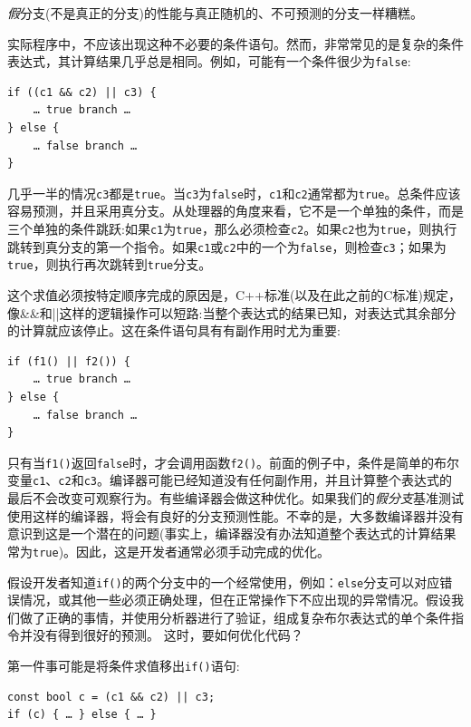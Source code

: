 \textit{假}分支(不是真正的分支)的性能与真正随机的、不可预测的分支一样糟糕。

实际程序中，不应该出现这种不必要的条件语句。然而，非常常见的是复杂的条件表达式，其计算结果几乎总是相同。例如，可能有一个条件很少为\texttt{false}:

\begin{lstlisting}[style=styleCXX]
if ((c1 && c2) || c3) {
	… true branch …
} else {
	… false branch …
}
\end{lstlisting}

几乎一半的情况\texttt{c3}都是\texttt{true}。当\texttt{c3}为\texttt{false}时，\texttt{c1}和\texttt{c2}通常都为\texttt{true}。总条件应该容易预测，并且采用真分支。从处理器的角度来看，它不是一个单独的条件，而是三个单独的条件跳跃:如果\texttt{c1}为\texttt{true}，那么必须检查\texttt{c2}。如果\texttt{c2}也为\texttt{true}，则执行跳转到真分支的第一个指令。如果\texttt{c1}或\texttt{c2}中的一个为\texttt{false}，则检查\texttt{c3}；如果为\texttt{true}，则执行再次跳转到\texttt{true}分支。

这个求值必须按特定顺序完成的原因是，C++标准(以及在此之前的C标准)规定，像\&\&和||这样的逻辑操作可以短路:当整个表达式的结果已知，对表达式其余部分的计算就应该停止。这在条件语句具有有副作用时尤为重要:

\begin{lstlisting}[style=styleCXX]
if (f1() || f2()) {
	… true branch …
} else {
	… false branch …
}
\end{lstlisting}

只有当\texttt{f1()}返回\texttt{false}时，才会调用函数\texttt{f2()}。前面的例子中，条件是简单的布尔变量\texttt{c1}、\texttt{c2}和\texttt{c3}。编译器可能已经知道没有任何副作用，并且计算整个表达式的最后不会改变可观察行为。有些编译器会做这种优化。如果我们的\textit{假分支}基准测试使用这样的编译器，将会有良好的分支预测性能。不幸的是，大多数编译器并没有意识到这是一个潜在的问题(事实上，编译器没有办法知道整个表达式的计算结果常为\texttt{true})。因此，这是开发者通常必须手动完成的优化。

假设开发者知道\texttt{if()}的两个分支中的一个经常使用，例如：\texttt{else}分支可以对应错误情况，或其他一些必须正确处理，但在正常操作下不应出现的异常情况。假设我们做了正确的事情，并使用分析器进行了验证，组成复杂布尔表达式的单个条件指令并没有得到很好的预测。 这时，要如何优化代码？

第一件事可能是将条件求值移出\texttt{if()}语句:

\begin{lstlisting}[style=styleCXX]
const bool c = (c1 && c2) || c3;
if (c) { … } else { … }
\end{lstlisting}

